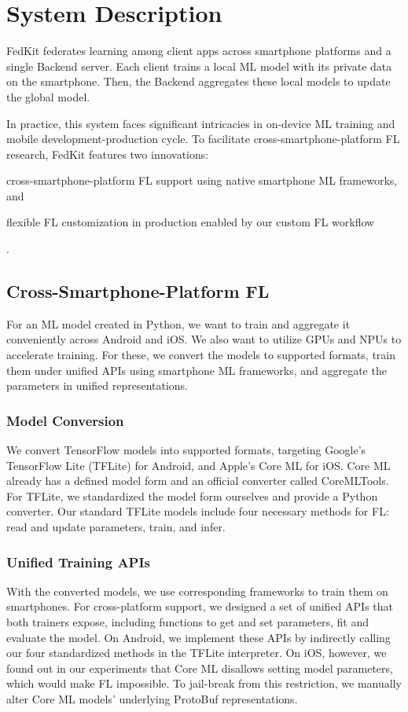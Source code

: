 \documentclass[letterpaper]{article} %
\begin{document}
\section{System Description}

FedKit federates learning among client apps across smartphone platforms and
a single Backend server.
Each client trains a local ML model with its private data on the smartphone.
Then, the Backend aggregates these local models to update the global model.

In practice, this system faces significant intricacies in
on-device ML training and mobile development-production cycle.
To facilitate cross-smartphone-platform FL research,
FedKit features two innovations:
\begin{enumerate*}[label=\arabic*]
    \item cross-smartphone-platform FL support using
        native smartphone ML frameworks, and
    \item flexible FL customization in production enabled by
        our custom FL workflow
\end{enumerate*}.

\subsection{Cross-Smartphone-Platform FL}

For an ML model created in Python,
we want to train and aggregate it conveniently across Android and iOS.
We also want to utilize GPUs and NPUs to accelerate training.
For these, we convert the models to supported formats,
train them under unified APIs using smartphone ML frameworks,
and aggregate the parameters in unified representations.

\subsubsection{Model Conversion}
We convert TensorFlow models into supported formats,
targeting Google's TensorFlow Lite (TFLite) for Android,
and Apple's Core ML for iOS.
Core ML already has a defined model form and an official converter called
CoreMLTools.
For TFLite, we standardized the model form ourselves and
provide a Python converter.
Our standard TFLite models include four necessary methods for FL:
read and update parameters, train, and infer.

\subsubsection{Unified Training APIs}
With the converted models, we use corresponding frameworks to train them
on smartphones.
For cross-platform support,
we designed a set of unified APIs that both trainers expose,
including functions to get and set parameters, fit and evaluate the model.
On Android, we implement these APIs by indirectly calling
our four standardized methods in the TFLite interpreter.
On iOS, however, we found out in our experiments that
Core ML disallows setting model parameters,
which would make FL impossible.
To jail-break from this restriction, we manually alter
Core ML models' underlying ProtoBuf representations.
\end{document}
